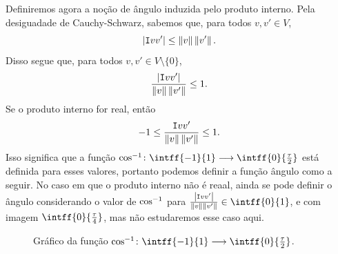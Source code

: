 Definiremos agora a noção de ângulo induzida pelo produto interno. Pela desiguadade de Cauchy-Schwarz, sabemos que, para todos $v,v' \in V$,
	\begin{equation*}
	\left\vert{\mathtt I{v}{v'}}\right\vert \leq \left\Vert{v}\right\Vert\left\Vert{v'}\right\Vert.
	\end{equation*}
Disso segue que, para todos $v,v' \in V\setminus\{0\}$,
	\begin{equation*}
	\frac{\left\vert{\mathtt I{v}{v'}}\right\vert}{\left\Vert{v}\right\Vert\left\Vert{v'}\right\Vert} \leq 1.
	\end{equation*}
Se o produto interno for real, então
	\begin{equation*}
	-1 \leq \frac{\mathtt I{v}{v'}}{\left\Vert{v}\right\Vert\left\Vert{v'}\right\Vert} \leq 1.
	\end{equation*}
Isso significa que a função $\cos\inv\colon \intff{-1}{1} \to \intff{0}{\frac{\tau}{2}}$ está definida para esses valores, portanto podemos definir a função ângulo como a seguir. No caso em que o produto interno não é reaal, ainda se pode definir o ângulo considerando o valor de $\cos^{-1}$ para $\frac{\abs{\inte{v}{v'}}}{\nor{v}\nor{v'}}\in \intff{0}{1}$, e com imagem $\intff{0}{\frac{\tau}{4}}$, mas não estudaremos esse caso aqui.

\begin{figure}
\centering
{}
\caption{Gráfico da função $\cos\inv\colon \intff{-1}{1} \to \intff{0}{\frac{\tau}{2}}$.}
\label{fig:cossenoinv}
\end{figure}

